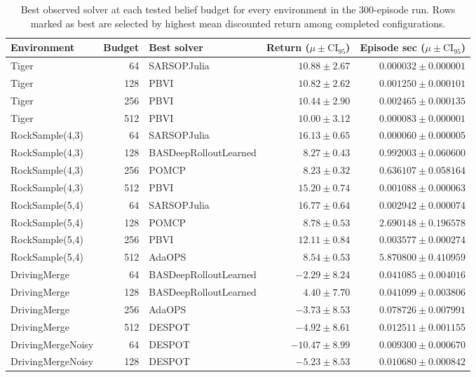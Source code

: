 \documentclass[10pt,twocolumn]{article}
\begin{document}
\begin{table}[t]
\centering
\caption{Best observed solver at each tested belief budget for every environment in the 300-episode run. Rows marked as best are selected by highest mean discounted return among completed configurations.}
\label{tab:budgetwinners}
\scriptsize
\begin{tabular}{l r l r r}
\toprule
Environment & Budget & Best solver & Return ($\mu\pm\mathrm{CI}_{95}$) & Episode sec ($\mu\pm\mathrm{CI}_{95}$) \\
\midrule
Tiger & 64 & SARSOPJulia & $10.88\pm2.67$ & $0.000032\pm0.000001$ \\
Tiger & 128 & PBVI & $10.82\pm2.62$ & $0.001250\pm0.000101$ \\
Tiger & 256 & PBVI & $10.44\pm2.90$ & $0.002465\pm0.000135$ \\
Tiger & 512 & PBVI & $10.00\pm3.12$ & $0.000083\pm0.000001$ \\
\midrule
RockSample(4,3) & 64 & SARSOPJulia & $16.13\pm0.65$ & $0.000060\pm0.000005$ \\
RockSample(4,3) & 128 & BASDeepRolloutLearned & $8.27\pm0.43$ & $0.992003\pm0.060600$ \\
RockSample(4,3) & 256 & POMCP & $8.23\pm0.32$ & $0.636107\pm0.058164$ \\
RockSample(4,3) & 512 & PBVI & $15.20\pm0.74$ & $0.001088\pm0.000063$ \\
\midrule
RockSample(5,4) & 64 & SARSOPJulia & $16.77\pm0.64$ & $0.002942\pm0.000074$ \\
RockSample(5,4) & 128 & POMCP & $8.78\pm0.53$ & $2.690148\pm0.196578$ \\
RockSample(5,4) & 256 & PBVI & $12.11\pm0.84$ & $0.003577\pm0.000274$ \\
RockSample(5,4) & 512 & AdaOPS & $8.54\pm0.53$ & $5.870800\pm0.410959$ \\
\midrule
DrivingMerge & 64 & BASDeepRolloutLearned & $-2.29\pm8.24$ & $0.041085\pm0.004016$ \\
DrivingMerge & 128 & BASDeepRolloutLearned & $4.40\pm7.70$ & $0.041099\pm0.003806$ \\
DrivingMerge & 256 & AdaOPS & $-3.73\pm8.53$ & $0.078726\pm0.007991$ \\
DrivingMerge & 512 & DESPOT & $-4.92\pm8.61$ & $0.012511\pm0.001155$ \\
\midrule
DrivingMergeNoisy & 64 & DESPOT & $-10.47\pm8.99$ & $0.009300\pm0.000670$ \\
DrivingMergeNoisy & 128 & DESPOT & $-5.23\pm8.53$ & $0.010680\pm0.000842$ \\

\end{tabular}
\end{table}
\end{document}
